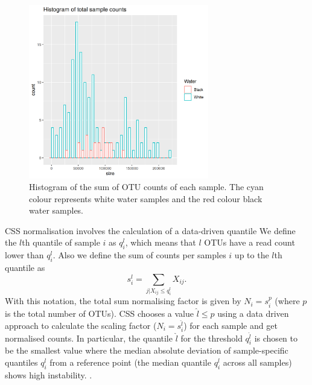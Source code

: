  
\begin{figure}[htb]
\centering
\includegraphics[width = 0.7\textwidth]{histogramofcountdata}
\caption{Histogram of the sum of OTU counts of each sample. The cyan colour represents white water samples and the red colour black water samples.}
\label{fig:counthistogram}
\end{figure}

CSS normalisation involves the calculation of a data-driven quantile 
We define the $l$th quantile of sample $i$ as $q_i^l$, which means that $l$ OTUs have a read count lower than $q_i^l$. Also we define the sum of counts per samples $i$ up to the $l$th quantile as
\begin{equation}
	s_{i}^{l}=\sum_{j|X_{ij} \leq q_{i}^{l}} X_{ij}.
\end{equation} 
With this notation, the total sum normalising factor is given by $N_i = s_i^p$ (where $p$ is the total number of OTUs). CSS chooses a value $\hat{l} \leq p$ using a data driven approach to calculate the scaling factor ($N_i = s_i^{\hat{l}}$) for each sample and get normalised counts.
In particular, the quantile $\hat{l}$ for the threshold $q_i^{\hat{l}}$ is chosen  to be the smallest value where the median absolute deviation of sample-specific quantiles $q_i^l$ from a reference point (the median quantile $q_i^l$ across all samples) shows high instability. \cite{css_diff_abund}.

